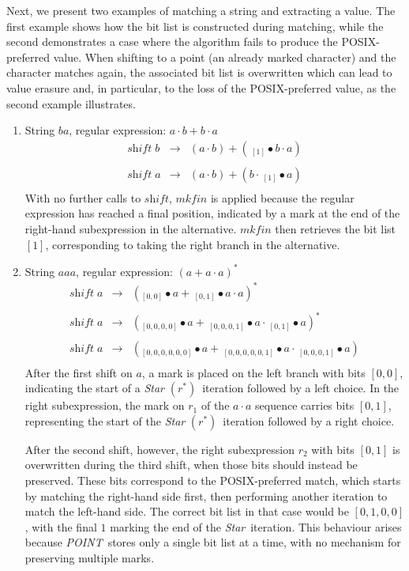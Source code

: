 \documentclass[12pt]{article}
\newcommand{\shift}{\textit{shift}}
\newcommand{\Star}{\textit{Star}}
\newcommand{\POINT}{\textit{POINT}}
\newcommand{\mkfin}{\textit{mkfin}}
\newcommand{\STARText}{\textit{Star} $(r^*)$}
\begin{document}
Next, we present two examples of matching a string and extracting a value.  
The first example shows how the bit list is constructed during matching,  
while the second demonstrates a case where the algorithm fails to produce the POSIX-preferred value.
When shifting to a point (an already marked character) and the character matches again, the associated 
bit list is overwritten which can lead to value erasure and, in particular, to the loss of the POSIX-preferred value,  
as the second example illustrates.  


\begin{enumerate}
  \item String $ba$, regular expression: $a \cdot b + b \cdot a$
  \[
    \begin{array}{rcl}
      \shift\; b & \rightarrow & (a \cdot b) + (\,_{[1]} \bullet b \cdot a)\\\\
      \shift\; a & \rightarrow & (a \cdot b) + (b \cdot \,_{[1]} \bullet a)\\
    \end{array}
  \]
  With no further calls to $\shift$, $\mkfin$ is applied because the regular expression 
  has reached a final position, indicated by a mark at the end of the right-hand subexpression in 
  the alternative. $\mkfin$ then retrieves the bit list $[1]$, corresponding to taking the 
  right branch in the alternative.

  \item String $aaa$, regular expression: $(a + a \cdot a)^*$
  \[
    \begin{array}{rcl}
      \shift\; a & \rightarrow & (_{[0,0]} \bullet a + \,_{[0,1]} \bullet a \cdot a)^*\\\\
      \shift\; a & \rightarrow & (_{[0,0,0,0]} \bullet a + \,_{[0,0,0,1]} \bullet a \cdot \,_{[0,1]} \bullet a)^*\\\\
      \shift\; a & \rightarrow & (_{[0,0,0,0,0,0]} \bullet a + \,_{[0,0,0,0,0,1]} \bullet a \cdot \,_{[0,0,0,1]} \bullet a)\\
    \end{array}
  \]
  After the first shift on $a$, a mark is placed on the left branch with bits $[0,0]$,  
  indicating the start of a \STARText\ iteration followed by a left choice.  
  In the right subexpression, the mark on $r_1$ of the $a \cdot a$ sequence carries bits $[0,1]$,  
  representing the start of the \STARText\ iteration followed by a right choice.  

  After the second shift, however, the right subexpression $r_2$ with bits $[0,1]$ is overwritten during 
  the third shift, when those bits should instead be preserved.  
  These bits correspond to the POSIX-preferred match, which starts by matching the right-hand side first,  
  then performing another iteration to match the left-hand side.  
  The correct bit list in that case would be $[0,1,0,0]$, with the final $1$ marking the end of the \Star\ iteration.  
  This behaviour arises because \POINT\ stores only a single bit list at a time, with no mechanism for preserving multiple marks.  

\end{enumerate}
\end{document}
